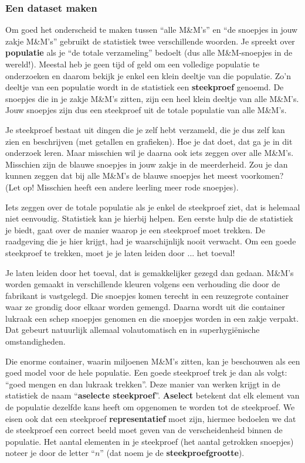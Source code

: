 \documentclass[11pt]{article}
\begin{document}
\subsubsection{Een dataset maken}

Om goed het onderscheid te maken tussen “alle M\&M’s” en “de snoepjes in jouw zakje M\&M’s”
gebruikt de statistiek twee verschillende woorden. Je spreekt over {\bf populatie} als je “de totale
verzameling” bedoelt (dus alle M\&M-snoepjes in de wereld!). Meestal heb je geen tijd of geld om een volledige
populatie te onderzoeken en daarom bekijk je enkel een klein deeltje van die populatie. Zo’n deeltje
van een populatie wordt in de statistiek een {\bf steekproef} genoemd. De snoepjes die in je zakje
M\&M’s zitten, zijn een heel klein deeltje van alle M\&M’s. Jouw snoepjes zijn dus een steekproef uit
de totale populatie van alle M\&M’s.

Je steekproef bestaat uit dingen die je zelf hebt verzameld, die je dus zelf kan zien en beschrijven
(met getallen en grafieken). Hoe je dat doet, dat ga je in dit onderzoek leren. Maar misschien wil je
daarna ook iets zeggen over alle M\&M’s. Misschien zijn de blauwe snoepjes in jouw zakje in de
meerderheid. Zou je dan kunnen zeggen dat bij alle M\&M’s de blauwe snoepjes het meest
voorkomen? (Let op! Misschien heeft een andere leerling meer rode snoepjes).

Iets zeggen over de totale populatie als je enkel de steekproef ziet, dat is helemaal niet eenvoudig.
Statistiek kan je hierbij helpen. Een eerste hulp die de statistiek je biedt, gaat over de manier waarop
je een steekproef moet trekken. De raadgeving die je hier krijgt, had je waarschijnlijk nooit
verwacht. Om een goede steekproef te trekken, moet je je laten leiden door ... het toeval!

Je laten leiden door het toeval, dat is gemakkelijker gezegd dan gedaan. M\&M's worden gemaakt in verschillende
kleuren volgens een verhouding die door de fabrikant is vastgelegd. Die snoepjes komen terecht in
een reuzegrote container waar ze grondig door elkaar worden gemengd. Daarna wordt uit die
container lukraak een schep snoepjes genomen en die snoepjes worden in een zakje verpakt. Dat
gebeurt natuurlijk allemaal volautomatisch en in superhygiënische omstandigheden.

Die enorme container, waarin miljoenen M\&M’s zitten, kan je beschouwen als een goed model voor
de hele populatie. Een goede steekproef trek je dan als volgt: “goed mengen en dan lukraak trekken”.
Deze manier van werken krijgt in de statistiek de naam “{\bf aselecte steekproef}”. {\bf Aselect} betekent dat elk element van de populatie dezelfde kans heeft om opgenomen te worden tot de steekproef. We eisen ook dat een steekproef {\bf representatief} moet zijn, hiermee bedoelen we dat de steekproef een correct beeld moet geven van de verscheidenheid binnen de populatie. Het
aantal elementen in je steekproef (het aantal getrokken snoepjes) noteer je door de letter “$n$” (dat
noem je de {\bf steekproefgrootte}).
\end{document}

